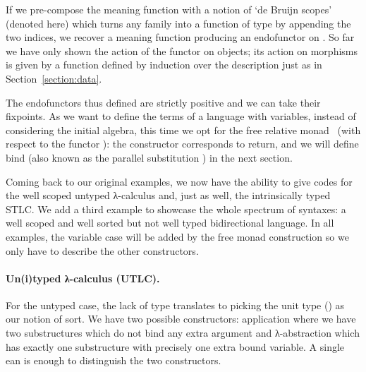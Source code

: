If we pre-compose the meaning function  with a notion of `de Bruijn scopes'
(denoted  here) which turns any   family into a function
of type      by appending the two
 indices, we recover a meaning function producing an endofunctor on
 . So far we have only shown the action of the functor on objects;
its action on morphisms is given by a function  defined by induction over
the description just as in Section~\ref{section:data}.

\begin{center}
\end{center}

The endofunctors thus defined are strictly positive and we can take their fixpoints.
As we want to define the terms of a language with variables, instead of
considering the initial algebra, this time we opt for the free relative
monad~\cite{JFR4389} (with respect to the functor ): the 
constructor corresponds to return, and we will define bind (also known as
the parallel substitution ) in the next section.


\begin{center}
\end{center}

Coming back to our original examples, we now have the ability to give
codes for the well scoped untyped λ-calculus and, just as well,
the intrinsically typed STLC. We add a third
example to showcase the whole spectrum of syntaxes: a well scoped and
well sorted but not well typed bidirectional language. In all examples,
the variable case will be added by the free monad construction so we only
have to describe the other constructors.


\paragraph{Un(i)typed λ-calculus (UTLC).} For the untyped case, the lack of
type translates to picking the unit type () as our notion of sort.
We have two possible
constructors: application where we have two substructures which do not bind
any extra argument and λ-abstraction which has exactly one substructure
with precisely one extra bound variable. A single ean is enough to
distinguish the two constructors.


